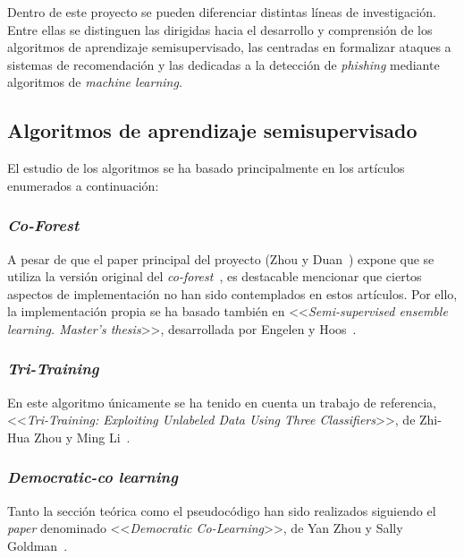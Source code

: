 
Dentro de este proyecto se pueden diferenciar distintas líneas de investigación. Entre ellas se distinguen las dirigidas hacia el desarrollo y comprensión de los algoritmos de aprendizaje semisupervisado, las centradas en formalizar ataques a sistemas de recomendación y las dedicadas a la detección de \textit{phishing} mediante algoritmos de \textit{machine learning}.

\subsection{Algoritmos de aprendizaje semisupervisado}

El estudio de los algoritmos se ha basado principalmente en los artículos enumerados a continuación:

\subsubsection{\textit{Co-Forest}}

A pesar de que el paper principal del proyecto (Zhou y Duan~\cite{zhou2021SemisupervisedRecommendationAttack}) expone que se utiliza la versión original del \textit{co-forest}~\cite{originalCoForest2007}, es destacable mencionar que ciertos aspectos de implementación no han sido contemplados en estos artículos. Por ello, la implementación propia se ha basado también en <<\textit{Semi-supervised ensemble learning. Master’s thesis}>>, desarrollada por Engelen y Hoos~\cite{engelen2018thesis}.

\subsubsection{\textit{Tri-Training}}

En este algoritmo únicamente se ha tenido en cuenta un trabajo de referencia, <<\textit{Tri-Training: Exploiting Unlabeled Data Using Three Classifiers}>>, de Zhi-Hua Zhou y Ming Li~\cite{tritraining2005@original}.

\subsubsection{\textit{Democratic-co learning}}

Tanto la sección teórica como el pseudocódigo han sido realizados siguiendo el \textit{paper} denominado <<\textit{Democratic Co-Learning}>>, de Yan Zhou y Sally Goldman~\cite{democraticCoLearning2004original}.


